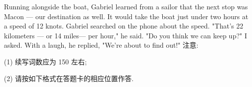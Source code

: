 \documentclass{英语试卷}
\begin{document}
\par Running alongside the boat, Gabriel learned from a sailor that the next stop was Macon — our destination as well. It would take the boat just under two hours at a speed of 12 knots. Gabriel searched on the phone about the speed. "That’s 22 kilometers — or 14 miles— per hour," he said. "Do you think we can keep up?" I asked. With a laugh, he replied, "We’re about to find out!" 注意:\par
\par (1) 续写词数应为 150 左右;\par
\par (2) 请按如下格式在答题卡的相应位置作答.\par
{}
\end{document}
